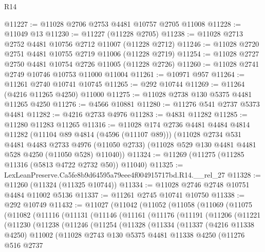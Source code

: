 \begin{lexlean}{R14}
\begin{coremodule}
@11227 := @11028 @2706 @2753 @4481 @10757 @2705 @11008
@11228 := @11049 @13
@11230 := @11227 (@11228 @2705)
@11238 := @11028 @2713 @2752 @4481 @10756 @2712 @11007 (@11228 @2712)
@11246 := @11028 @2720 @2751 @4481 @10755 @2719 @11006 (@11228 @2719)
@11254 := @11028 @2727 @2750 @4481 @10754 @2726 @11005 (@11228 @2726)
@11260 := @11028 @2741 @2749 @10746 @10753 @11000 @11004
@11261 := @10971 @957
@11264 := @11261 @2740 @10741 @10745
@11265 := @292 @10744
@11269 := @11264 (@4216 @11265 @4250) @11000
@11275 := @11028 @2738 @130 @5375 @4481 @11265 @4250
@11276 := @4566 @10881
@11280 := @11276 @541 @2737 @5373 @4481
@11282 := @4216 @2733 @4976
@11283 := @4831 @11282
@11285 := @11280 @11283 @11265
@11316 := @11028
    @174
    @2736
    @4481
    @4484
    @4814
    @11282
    (@11104 @89 @4814 (@4596 (@11107 @89)))
    (@11028
      @2734
      @531
      @4481
      @4483
      @2733
      @4976
      (@11050 @2733)
      (@11028 @529 @130 @4481 @4481 @528 @4250 (@11050 @528) @11040))
@11324 := @11269 (@11275 (@11285 @11316 (@5813 @4722 @2732 @50)) @11040)
@11325 := LexLeanPreserve.Ca5fe8b9d64595a79eee4f004915717bd.R14.__rel_27
@11328 := @11260 (@11324 (@11325 @10744))
@11334 := @11028 @2746 @2748 @10751 @4484 @11002 @5136
@11337 := @11261 @2745 @10741 @10750
@11338 := @292 @10749
@11432 := @11027
    (@11042
      (@11052
        (@11058
          (@11069
            (@11075
              (@11082
                (@11116
                  (@11131
                    (@11146
                      (@11161
                        (@11176
                          (@11191
                            (@11206
                              (@11221
                                (@11230
                                  (@11238
                                    (@11246
                                      (@11254
                                        (@11328
                                          (@11334
                                            (@11337
                                              (@4216 @11338 @4250)
                                              @11002
                                              (@11028
                                                @2743
                                                @130
                                                @5375
                                                @4481
                                                @11338
                                                @4250
                                                (@11276
                                                  @516
                                                  @2737

\end{coremodule}
\end{lexlean}
